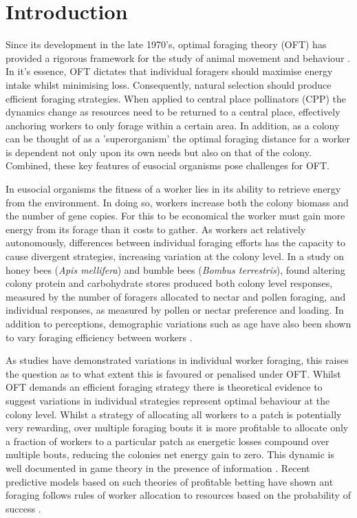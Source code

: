 \documentclass[11pt,usenames,dvipsnames]{article}
\begin{document}
\section{Introduction}

\begin{linenumbers}
\hspace{\parindent}
Since its development in the late 1970's, optimal foraging theory (OFT) has provided a rigorous framework for the study of animal movement and behaviour \citep{Pyke1984}. In it's essence, OFT dictates that individual foragers should maximise energy intake whilst minimising loss. Consequently, natural selection should produce efficient foraging strategies. When applied to central place pollinators (CPP) the dynamics change as resources need to be returned to a central place, effectively anchoring workers to only forage within a certain area. In addition, as a colony can be thought of as a 'superorganism' \citep{Holldobler2009} the optimal foraging distance for a worker is dependent not only upon its own needs but also on that of the colony. Combined, these key features of eusocial organisms pose challenges for OFT. 

In eusocial organisms the fitness of a worker lies in its ability to retrieve energy from the environment. In doing so, workers increase both the colony biomass and the number of gene copies. For this to be economical the worker must gain more energy from its forage than it costs to gather. As workers act relatively autonomously, differences between individual foraging efforts has the capacity to cause divergent strategies, increasing variation at the colony level. In a study on honey bees (\textit{Apis mellifera}) and bumble bees (\textit{Bombus terrestris}), \cite{Hendriksma2019} found altering colony protein and carbohydrate stores produced both colony level responses, measured by the number of foragers allocated to nectar and pollen foraging, and individual responses, as measured by pollen or nectar preference and loading. In addition to perceptions, demographic variations such as age have also been shown to vary foraging efficiency between workers \citep{Schippers2006, Klein2019}.

As studies have demonstrated variations in individual worker foraging, this raises the question as to what extent this is favoured or penalised under OFT. Whilst OFT demands an efficient foraging strategy there is theoretical evidence to suggest variations in individual strategies represent optimal behaviour at the colony level. Whilst a strategy of allocating all workers to a patch is potentially very rewarding, over multiple foraging bouts it is more profitable to allocate only a fraction of workers to a particular patch as energetic losses compound over multiple bouts, reducing the colonies net energy gain to zero. This dynamic is well documented in game theory in the presence of information \citep{Kelly1956}. Recent predictive models based on such theories of profitable betting have shown ant foraging follows rules of worker allocation to resources based on the probability of success \citep{Baddeley2019}.


\end{linenumbers}
\end{document}
